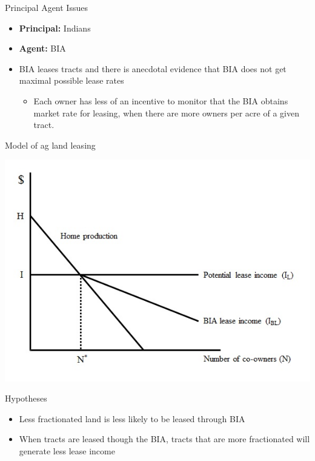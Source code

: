 \documentclass[ignorenonframetext,]{beamer}
\begin{document}
\begin{frame}{Principal Agent Issues}

\begin{itemize}
\item
  \textbf{Principal:} Indians\\
\item
  \textbf{Agent:} BIA
\item
  BIA leases tracts and there is anecdotal evidence that BIA does not
  get maximal possible lease rates

  \begin{itemize}
  \itemsep1pt\parskip0pt
  \item
    Each owner has less of an incentive to monitor that the BIA obtains
    market rate for leasing, when there are more owners per acre of a
    given tract.
  \end{itemize}
\end{itemize}

\end{frame}

\begin{frame}{Model of ag land leasing}

\centering
\includegraphics{model.jpeg}

\end{frame}

\begin{frame}{Hypotheses}

\begin{itemize}
\item
  Less fractionated land is less likely to be leased through BIA
\item
  When tracts are leased though the BIA, tracts that are more
  fractionated will generate less lease income
\end{itemize}

\end{frame}
\end{document}
